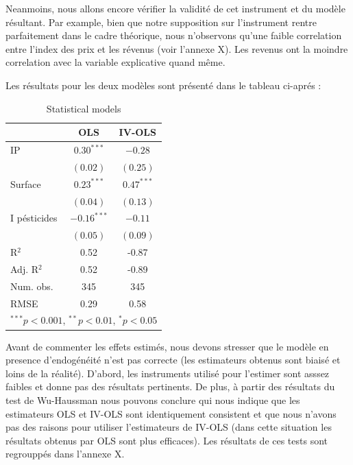 \documentclass[11pt,]{article}
\begin{document}
Neanmoins, nous allons encore vérifier la validité de cet instrument et
du modèle résultant. Par example, bien que notre supposition sur
l'instrument rentre parfaitement dans le cadre théorique, nous
n'observons qu'une faible correlation entre l'index des prix et les
révenus (voir l'annexe X). Les revenus ont la moindre correlation avec
la variable explicative quand même.

Les résultats pour les deux modèles sont présenté dans le tableau
ci-aprés :

\FloatBarrier

\begin{table}[!htbp]
\begin{center}
\begin{tabular}{l c c }
\hline
 & OLS & IV-OLS \\
\hline
IP           & $0.30^{***}$  & $-0.28$      \\
             & $(0.02)$      & $(0.25)$     \\
Surface      & $0.23^{***}$  & $0.47^{***}$ \\
             & $(0.04)$      & $(0.13)$     \\
I pésticides & $-0.16^{***}$ & $-0.11$      \\
             & $(0.05)$      & $(0.09)$     \\
\hline
R$^2$        & 0.52          & -0.87        \\
Adj. R$^2$   & 0.52          & -0.89        \\
Num. obs.    & 345           & 345          \\
RMSE         & 0.29          & 0.58         \\
\hline
\multicolumn{3}{l}{\scriptsize{$^{***}p<0.001$, $^{**}p<0.01$, $^*p<0.05$}}
\end{tabular}
\caption{Statistical models}
\label{table : ols et ivols}
\end{center}
\end{table}

\FloatBarrier

Avant de commenter les effets estimés, nous devons stresser que le
modèle en presence d'endogénéité n'est pas correcte (les estimateurs
obtenus sont biaisé et loins de la réalité). D'abord, les instruments
utilisé pour l'estimer sont asssez faibles et donne pas des résultats
pertinents. De plus, à partir des résultats du test de Wu-Haussman nous
pouvons conclure qui nous indique que les estimateurs OLS et IV-OLS sont
identiquement consistent et que nous n'avons pas des raisons pour
utiliser l'estimateurs de IV-OLS (dans cette situation les résultats
obtenus par OLS sont plus efficaces). Les résultats de ces tests sont
regrouppés dans l'annexe X.
\end{document}
